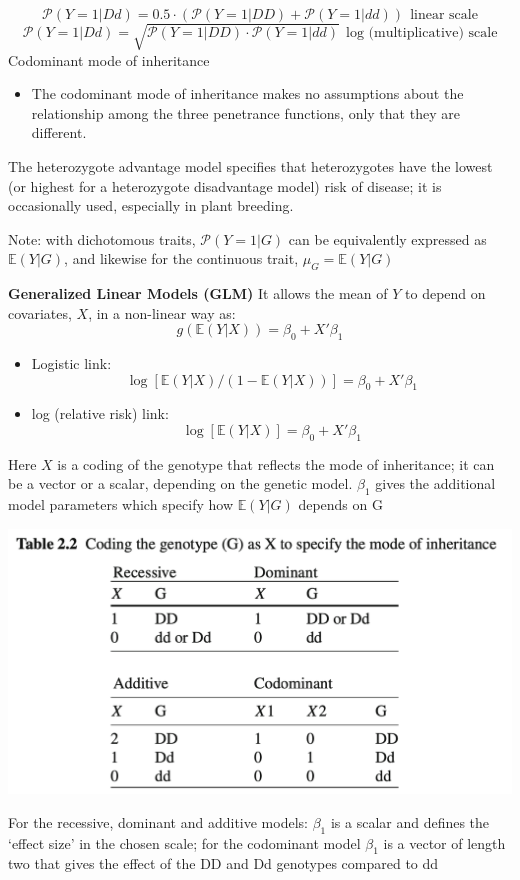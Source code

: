 \documentclass[a4paper,twoside,11pt]{article}
\begin{document}
$$
\mathcal{P}(Y=1|Dd) = 0.5 \cdot (\mathcal{P}(Y=1|DD)+ \mathcal{P}(Y=1|dd)) \ \ \text{linear scale}
$$
$$
\mathcal{P}(Y=1|Dd) = \sqrt{\mathcal{P}(Y=1|DD) \cdot \mathcal{P}(Y=1|dd)} \ \ \text{log (multiplicative) scale}
$$
\textcolor{NavyBlue}{Codominant mode of inheritance}
\begin{itemize}
    \item The codominant mode of inheritance makes no assumptions about the relationship among the three penetrance functions, only that they are different.
\end{itemize}
The heterozygote advantage model specifies that heterozygotes have the lowest (or highest for a heterozygote disadvantage model) risk of disease; it is occasionally used, especially in plant breeding.
\begin{shaded*}
\noindent Note: with dichotomous traits, $\mathcal{P}(Y=1|G)$ can be equivalently expressed as $\mathbb{E}(Y|G)$, and likewise for the continuous trait, $\mu_G = \mathbb{E}(Y|G)$
\end{shaded*}
\noindent \textbf{\textcolor{NavyBlue}{Generalized Linear Models (GLM)}}
\newline
\newline
It allows the mean of $Y$ to depend on covariates, $X$, in a non-linear way as:
$$
g(\mathbb{E}(Y|X)) = \beta_0 + X' \beta_1
$$
\begin{itemize}
    \item Logistic link:
$$
\log [\mathbb{E}(Y|X)/(1-\mathbb{E}(Y|X))] = \beta_0 + X' \beta_1
$$
    \item log (relative risk) link:
$$
\log [\mathbb{E}(Y|X)] = \beta_0 + X' \beta_1
$$
\end{itemize}
Here $X$ is a coding of the genotype that reflects the mode of inheritance; it can be a vector or a scalar, depending on the genetic model. 
\newline
\newline
$\beta_1$ gives the additional model parameters which specify how $\mathbb{E}(Y|G)$ depends on G
\begin{center}
\includegraphics[scale=0.5]{figure8.png}
\end{center}
For the recessive, dominant and additive models:
\newline
\newline
$\beta_1$ is a scalar and defines the ‘effect size’ in the chosen scale; for the codominant model 
\newline
\newline
$\beta_1$ is a vector of length two that gives the effect of the DD and Dd genotypes compared to dd
\end{document}
